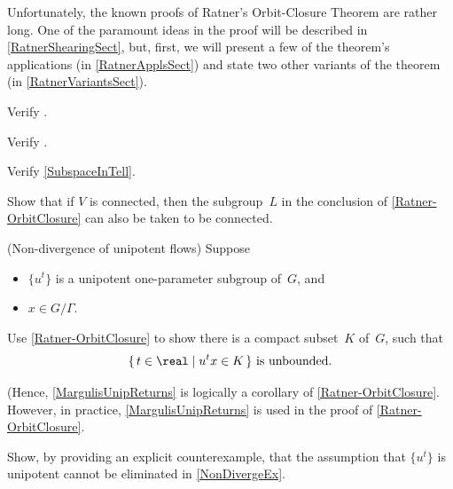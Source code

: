 Unfortunately, the known proofs of Ratner's Orbit-Closure Theorem are rather long. 
One of the paramount ideas in the proof will be described in \cref{RatnerShearingSect}, but, first, we will present a few of the theorem's applications (in \cref{RatnerApplsSect}) and state two other variants of the theorem (in \cref{RatnerVariantsSect}).

\begin{exercises}

\item \label{LineDenseInT2-notdenseExer}
Verify .

\item \label{LineDenseInT2-denseExer}
Verify .

\item \label{SubspaceInTellExer}
Verify \cref{SubspaceInTell}.

\item Show that if $V$ is connected, then the subgroup~$L$ in the conclusion of \cref{Ratner-OrbitClosure} can also be taken to be connected.

\item \label{NonDivergeEx}
(Non-divergence of unipotent flows)
Suppose 
	\begin{itemize}
	\item $\{u^t\}$ is a unipotent one-parameter subgroup of~$G$,
	and
	\item $x \in G/\Gamma$.
	\end{itemize}
Use \cref{Ratner-OrbitClosure} to show there is a compact subset~$K$ of~$G$, such that 
	$$ \text{$\{\, t \in \real \mid u^t x \in K \,\}$ is unbounded.} $$
{\smaller (Hence, \cref{MargulisUnipReturns} is logically a corollary of \cref{Ratner-OrbitClosure}. However, in practice, \cref{MargulisUnipReturns} is used in the proof of \cref{Ratner-OrbitClosure}.\par}

\item Show, by providing an explicit counterexample, that the assumption that $\{u^t\}$ is unipotent cannot be eliminated in \cref{NonDivergeEx}.


\end{exercises}





